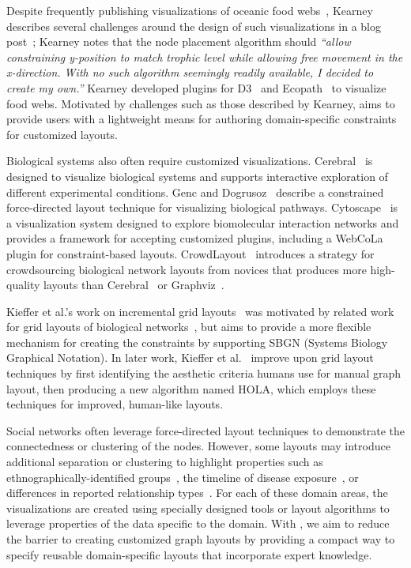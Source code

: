 Despite frequently publishing visualizations of oceanic food 
webs~\cite{kearney2012coupling,kearney2013amplification},
Kearney describes several challenges around the design of such visualizations
in a blog post~\cite{kearney2016blog}; Kearney notes that the node
placement algorithm should \emph{``allow constraining y-position to match
  trophic level while allowing free movement in the x-direction. With no
  such algorithm seemingly readily available, I decided to create my
  own.''} Kearney developed plugins for D3~\cite{kearney2017d3} and
Ecopath~\cite{kearney2017ecopath} to visualize food webs. 
Motivated by challenges such as those
described by Kearney, \projectname aims to provide users
with a lightweight means for authoring domain-specific constraints for customized layouts.

Biological systems also often require customized visualizations.
Cerebral~\cite{barsky2008cerebral} is designed to visualize
biological systems and supports interactive exploration of different
experimental conditions. Genc and Dogrusoz~\cite{genc2003constrained}
describe a constrained force-directed layout technique for visualizing 
biological pathways. Cytoscape~\cite{shannon2003cytoscape} is a
visualization system designed to explore biomolecular interaction networks
and provides a framework for accepting customized plugins, including 
a WebCoLa~\cite{WebCoLa} plugin for constraint-based layouts.
CrowdLayout~\cite{singh2018crowdlayout} introduces a strategy for crowdsourcing 
biological network layouts from novices that produces more high-quality
layouts than Cerebral~\cite{barsky2008cerebral} or Graphviz~\cite{ellson2001graphviz}.

Kieffer et al.'s work on incremental grid layouts~\cite{kieffer2013incremental}
was motivated by related work for grid layouts of biological 
networks~\cite{barsky2008cerebral,kojima2007efficient,li2005grid}, 
but aims to provide a more flexible mechanism for creating the constraints 
by supporting SBGN (Systems Biology Graphical Notation). In later
work, Kieffer et al.~\cite{kieffer2016hola} improve upon grid layout techniques
by first identifying the aesthetic criteria humans use for manual graph layout,
then producing a new algorithm named HOLA, which employs these techniques for improved,
human-like layouts.

Social networks often leverage force-directed layout techniques
to demonstrate the connectedness or clustering of the nodes. However, some
layouts may introduce additional separation or clustering
to highlight properties such as ethnographically-identified groups~\cite{rothenberg1998using},
the timeline of disease
exposure~\cite{fitzpatrick2001preventable,mcelroy2003network},
or differences in reported relationship types~\cite{fu2011hiv}.
For each of these domain areas, the visualizations are created using specially
designed tools or layout algorithms to leverage properties of the data
specific to the domain. With \projectname, we aim to reduce the barrier to
creating customized graph layouts by providing a compact way to specify
reusable domain-specific layouts that incorporate expert knowledge.


